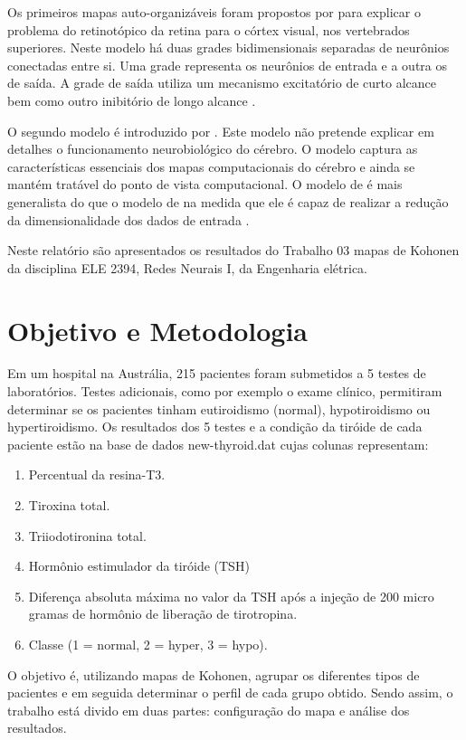 \documentclass[journal, a4paper]{IEEEtran}
\begin{document}
	Os primeiros mapas auto-organizáveis foram propostos por \citet{Malsburg1976} para explicar o problema do retinotópico da retina para o córtex visual, nos vertebrados superiores. Neste modelo há duas grades bidimensionais separadas de neurônios conectadas entre si. Uma grade representa os neurônios de entrada e a outra os de saída.  A grade de saída  utiliza um mecanismo excitatório de curto alcance bem como outro inibitório de longo alcance \citep{Haykin1999}. 
	
	O segundo modelo é introduzido por \citet{Kohonen1989}. Este modelo não pretende explicar em detalhes o funcionamento neurobiológico do cérebro. O modelo captura as características essenciais dos mapas computacionais do cérebro e ainda se mantém tratável do ponto de vista computacional.  O modelo de \citet{Kohonen1989} é mais generalista do que o modelo de \citet{Malsburg1976} na medida que ele é capaz de realizar a redução da dimensionalidade dos dados de entrada \citep{Haykin1999}.

	
	Neste relatório são apresentados os resultados do Trabalho 03 mapas de Kohonen da disciplina ELE 2394, Redes Neurais I, da Engenharia elétrica.
	

\section{Objetivo e Metodologia}


Em um hospital na Austrália, 215 pacientes foram submetidos a 5 testes de laboratórios. Testes adicionais, como por exemplo o exame clínico, permitiram determinar se os pacientes tinham eutiroidismo (normal), hypotiroidismo ou hypertiroidismo. Os resultados dos 5 testes e a condição da tiróide de cada paciente estão na base de dados new-thyroid.dat cujas colunas representam:

\begin{enumerate}
\item Percentual da resina-T3.
\item Tiroxina total.
\item Triiodotironina total.
\item Hormônio estimulador da tiróide (TSH)
\item  Diferença absoluta máxima no valor da TSH após a injeção de 200 micro gramas de hormônio de liberação de tirotropina.  
\item Classe (1 = normal, 2 = hyper, 3 = hypo).
\end{enumerate}


O objetivo é, utilizando mapas de Kohonen, agrupar os diferentes tipos de pacientes e em seguida determinar o perfil de cada grupo obtido. Sendo assim, o trabalho está divido em duas partes: configuração do mapa e análise dos resultados.
\end{document}
